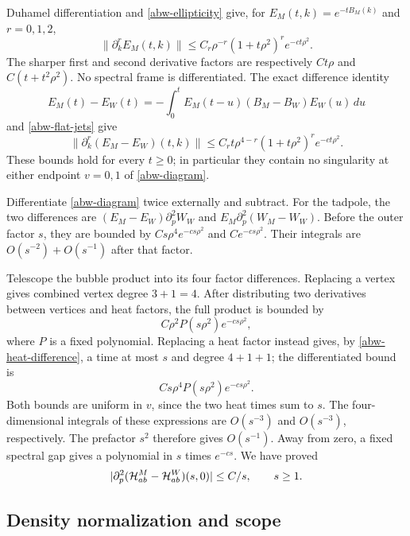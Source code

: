 Duhamel differentiation and \eqref{abw-ellipticity} give, for
\(E_M(t,k)=e^{-tB_M(k)}\) and \(r=0,1,2\),
\begin{equation}
 \|\partial_k^rE_M(t,k)\|
 \le C_r\rho^{-r}(1+t\rho^2)^r e^{-ct\rho^2}.
 \label{abw-heat}
\end{equation}
The sharper first and second derivative factors are respectively
\(Ct\rho\) and \(C(t+t^2\rho^2)\). No spectral frame is differentiated.
The exact difference identity
\[
 E_M(t)-E_W(t)
 =-\int_0^t E_M(t-u)(B_M-B_W)E_W(u)\,du
\]
and \eqref{abw-flat-jets} give
\begin{equation}
 \|\partial_k^r(E_M-E_W)(t,k)\|
 \le C_r t\rho^{4-r}(1+t\rho^2)^r e^{-ct\rho^2}.
 \label{abw-heat-difference}
\end{equation}
These bounds hold for every \(t\ge0\); in particular they contain no
singularity at either endpoint \(v=0,1\) of \eqref{abw-diagram}.

Differentiate \eqref{abw-diagram} twice externally and subtract.
For the tadpole, the two differences are
\((E_M-E_W)\partial_p^2W_W\) and
\(E_M\partial_p^2(W_M-W_W)\).
Before the outer factor \(s\), they are bounded by
\(Cs\rho^4e^{-cs\rho^2}\) and \(Ce^{-cs\rho^2}\).
Their integrals are \(O(s^{-2})+O(s^{-1})\) after that factor.

Telescope the bubble product into its four factor differences.
Replacing a vertex gives combined vertex degree \(3+1=4\).
After distributing two derivatives between vertices and heat factors,
the full product is bounded by
\[
 C\rho^2 P(s\rho^2)e^{-cs\rho^2},
\]
where \(P\) is a fixed polynomial. Replacing a heat factor instead
gives, by \eqref{abw-heat-difference}, a time at most \(s\) and degree
\(4+1+1\); the differentiated bound is
\[
 Cs\rho^4 P(s\rho^2)e^{-cs\rho^2}.
\]
Both bounds are uniform in \(v\), since the two heat times sum to \(s\).
The four-dimensional integrals of these expressions are
\(O(s^{-3})\) and \(O(s^{-3})\), respectively.
The prefactor \(s^2\) therefore gives \(O(s^{-1})\).
Away from zero, a fixed spectral gap gives a polynomial in \(s\)
times \(e^{-cs}\). We have proved
\begin{equation}
 |\partial_p^2({\cal H}_{ab}^M-{\cal H}_{ab}^W)(s,0)|
 \le C/s,\qquad s\ge1.
 \label{abw-two-point-bound}
\end{equation}

\subsection{Density normalization and scope}
\label{abw-density-section}

